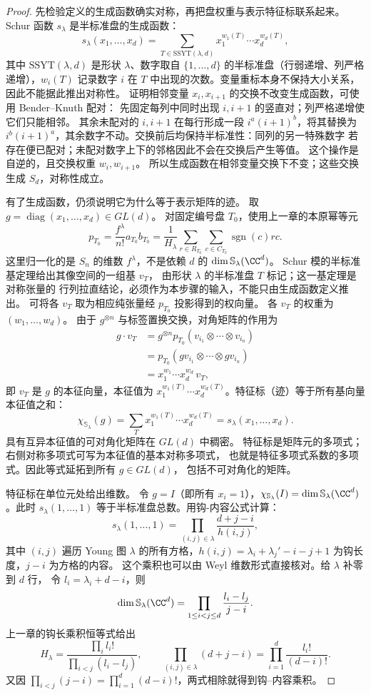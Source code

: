 \begin{proof}
先检验定义的生成函数确实对称，再把盘权重与表示特征标联系起来。
Schur 函数 $s_\lambda$ 是半标准盘的生成函数：
\[
s_\lambda(x_1,\dots,x_d)=\sum_{T\in\mathrm{SSYT}(\lambda,d)}x_1^{w_1(T)}\cdots x_d^{w_d(T)},
\]
其中 $\mathrm{SSYT}(\lambda,d)$ 是形状 $\lambda$、数字取自 $\{1,\dots,d\}$ 的半标准盘（行弱递增、列严格递增），$w_i(T)$ 记录数字 $i$ 在 $T$ 中出现的次数。变量重标本身不保持大小关系，因此不能据此推出对称性。
证明相邻变量 $x_i,x_{i+1}$ 的交换不改变生成函数，可使用 Bender--Knuth 配对：
先固定每列中同时出现 $i,i+1$ 的竖直对；列严格递增使它们只能相邻。
其余未配对的 $i,i+1$ 在每行形成一段 $i^a(i+1)^b$，将其替换为
$i^b(i+1)^a$，其余数字不动。交换前后均保持半标准性：同列的另一特殊数字
若存在便已配对；未配对数字上下的邻格因此不会在交换后产生等值。
这个操作是自逆的，且交换权重 $w_i,w_{i+1}$。
所以生成函数在相邻变量交换下不变；这些交换生成 $S_d$，对称性成立。

有了生成函数，仍须说明它为什么等于表示矩阵的迹。
取 $g=\operatorname{diag}(x_1,\dots,x_d)\in GL(d)$。
对固定编号盘 $T_0$，使用上一章的本原幂等元
\[
p_{T_0}=\frac{f^\lambda}{n!}a_{T_0}b_{T_0}
=\frac{1}{H_\lambda}\sum_{r\in R_{T_0}}\sum_{c\in C_{T_0}}
\operatorname{sgn}(c)rc.
\]
这里归一化的是 $S_n$ 的维数 $f^\lambda$，不是依赖 $d$ 的
$\dim\mathbb S_\lambda(\CC^d)$。
Schur 模的半标准基定理给出其像空间的一组基 $v_T$，
由形状 $\lambda$ 的半标准盘 $T$ 标记；这一基定理是对称张量的
行列拉直结论，必须作为本步骤的输入，不能只由生成函数定义推出。
可将各 $v_T$ 取为相应纯张量经 $p_{T_0}$ 投影得到的权向量。
各 $v_T$ 的权重为 $(w_1,\dots,w_d)$。
由于 $g^{\otimes n}$ 与标签置换交换，对角矩阵的作用为
\[
\begin{aligned}
g\cdot v_T
&=g^{\otimes n}p_{T_0}(v_{i_1}\otimes\cdots\otimes v_{i_n})\\
&=p_{T_0}(gv_{i_1}\otimes\cdots\otimes gv_{i_n})\\
&=x_1^{w_1}\cdots x_d^{w_d}\,v_T,
\end{aligned}
\]
即 $v_T$ 是 $g$ 的本征向量，本征值为 $x_1^{w_1(T)}\cdots x_d^{w_d(T)}$。特征标（迹）等于所有基向量本征值之和：
\[
\chi_{\mathbb{S}_\lambda}(g)=\sum_T x_1^{w_1(T)}\cdots x_d^{w_d(T)}=s_\lambda(x_1,\dots,x_d).
\]
具有互异本征值的可对角化矩阵在 $GL(d)$ 中稠密。
特征标是矩阵元的多项式；右侧对称多项式可写为本征值的基本对称多项式，
也就是特征多项式系数的多项式。因此等式延拓到所有 $g\in GL(d)$，
包括不可对角化的矩阵。

特征标在单位元处给出维数。
令 $g=I$（即所有 $x_i=1$），$\chi_{\mathbb{S}_\lambda}(I)=\dim\mathbb{S}_\lambda(\CC^d)$。此时 $s_\lambda(1,\dots,1)$ 等于半标准盘总数。用钩-内容公式计算：
\[
s_\lambda(1,\dots,1)=\prod_{(i,j)\in\lambda}\frac{d+j-i}{h(i,j)},
\]
其中 $(i,j)$ 遍历 Young 图 $\lambda$ 的所有方格，$h(i,j)=\lambda_i+\lambda_j'-i-j+1$ 为钩长度，$j-i$ 为方格的内容。
这个乘积也可以由 Weyl 维数形式直接核对。给 $\lambda$ 补零到 $d$ 行，
令 $l_i=\lambda_i+d-i$，则
\[
\dim\mathbb S_\lambda(\CC^d)
=\prod_{1\le i<j\le d}\frac{l_i-l_j}{j-i}.
\]
上一章的钩长乘积恒等式给出
\[
H_\lambda=\frac{\prod_i l_i!}{\prod_{i<j}(l_i-l_j)},
\qquad
\prod_{(i,j)\in\lambda}(d+j-i)
=\prod_{i=1}^d\frac{l_i!}{(d-i)!}.
\]
又因 $\prod_{i<j}(j-i)=\prod_{i=1}^d(d-i)!$，两式相除就得到钩--内容乘积。

\end{proof}
